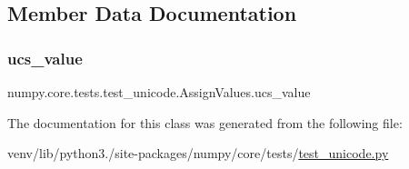 \subsection{Member Data Documentation}
\mbox{\label{classnumpy_1_1core_1_1tests_1_1test__unicode_1_1AssignValues_abe5cb8d71d16542bc0999e0880c99a84}} 
\subsubsection{\texorpdfstring{ucs\+\_\+value}{ucs\_value}}
{\footnotesize\ttfamily numpy.\+core.\+tests.\+test\+\_\+unicode.\+Assign\+Values.\+ucs\+\_\+value}



The documentation for this class was generated from the following file\+:\begin{DoxyCompactItemize}
\item 
venv/lib/python3./site-\/packages/numpy/core/tests/\hyperlink{test__unicode_8py}{test\+\_\+unicode.\+py}\end{DoxyCompactItemize}
